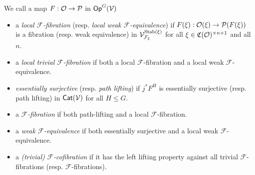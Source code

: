 \documentclass[a4paper,10pt
]{article}%
\renewcommand{\F}{\mathcal F}
\renewcommand{\1}{\ensuremath{\mathbb{id}}}
\begin{document}
\begin{definition}
      \label{MODEL_DEFN}
      We call a map $F: \mathcal{O} \to \mathcal{P}$ in $\mathsf{Op}^G(\mathcal V)$
      \begin{itemize}
      \item a {\em local $\F$-fibration} (resp. {\em local weak $\F$-equivalence}) if
            $F(\xi): \mathcal{O}(\xi)\to \mathcal{P}(F(\xi))$
            is a fibration (resp. weak equivalence) in $\V^{\Stab(\xi)}_{\F_\xi}$ for all $\xi\in \mathfrak C(\mathcal{O})^{\times n+1}$ and all $n$.
      \item a {\em local trivial $\F$-fibration} if both a local $\F$-fibration and a local weak $\F$-equivalence.
      \item {\em essentially surjective} (resp. {\em path lifting}) if $j^*F^H$ is essentially surjective (resp. path lifting) in $\mathsf{Cat}(\mathcal V)$ for all $H\leq G$.
      \item a {\em $\F$-fibration} if both path-lifting and a local $\F$-fibration.
      \item a {\em weak $\F$-equivalence} if both essentially surjective and a local weak $\F$-equivalence.
      \item a \textit{(trivial) $\F$-cofibration} if it has the left lifting property against all trivial $\F$-fibrations (resp. $\F$-fibrations).
      \end{itemize}
\end{definition}


\end{document}
